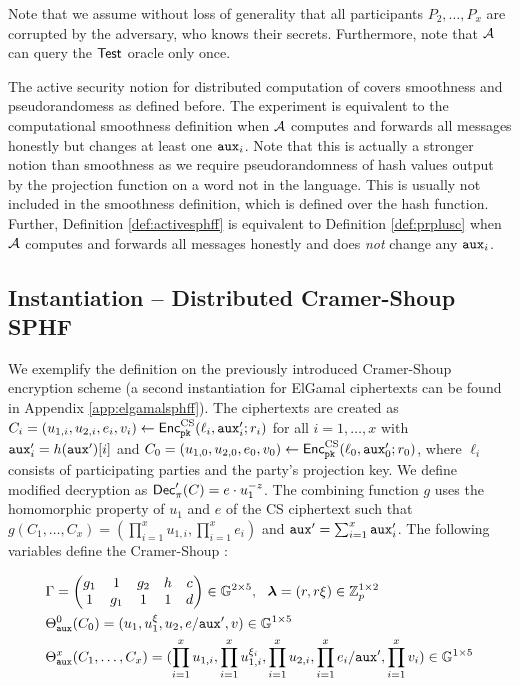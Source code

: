 \noindent
Note that we assume without loss of generality that all participants $P_2,\dots,P_x$ are corrupted by the adversary, who knows their secrets.
Furthermore, note that $\mathcal{A}$ can query the $\mathsf{Test}$ oracle only once.

The active security notion for distributed computation of \SPHFF covers smoothness and pseudorandomess as defined before.
The experiment is equivalent to the computational smoothness definition when $\mathcal{A}$ computes and forwards all messages honestly but changes at least one $\mathtt{aux}_i$.
Note that this is actually a stronger notion than smoothness as we require pseudorandomness of hash values output by the projection function on a word not in the language.
This is usually not included in the smoothness definition, which is defined over the hash function.
Further, Definition \ref{def:activesphff} is equivalent to Definition \ref{def:prplusc} when $\mathcal{A}$ computes and forwards all messages honestly and does \emph{not} change any $\mathtt{aux}_i$.

\subsection{Instantiation -- Distributed Cramer-Shoup SPHF}\label{sec:dcssphf}
We exemplify the \SPHFF definition on the previously introduced Cramer-Shoup encryption scheme (a second instantiation for ElGamal ciphertexts can be found in Appendix \ref{app:elgamalsphff}).
The ciphertexts are created as $C_i=(u_{1,i},u_{2,i},e_{i},v_i)\gets\mathsf{Enc}^{\mathrm{CS}}_{\mathtt{pk}}(\ell_i,\mathtt{aux}'_i;r_i)$ for all $i=1,\dots,x$ with $\mathtt{aux}'_i=h(\mathtt{aux}')[i]$ and $C_0=(u_{1,0},u_{2,0},\allowbreak e_{0},v_0)\gets\mathsf{Enc}^{\mathrm{CS}}_{\mathtt{pk}}(\ell_0,\allowbreak \mathtt{aux}'_0;r_0)$, where $\ell_i$ consists of participating parties and the party's projection key.
We define modified decryption as $\mathsf{Dec}'_\pi(C)=e\cdot u_1^{-z}$.
The combining function $g$ uses the homomorphic property of $u_1$ and $e$ of the CS ciphertext such that $g(C_1,\dots,C_x)=(\prod^x_{i=1}u_{1,i},\prod^x_{i=1}e_i)$ and $\mathtt{aux}'=\sum_{i=1}^{x}\mathtt{aux}'_i$.
The following variables define the Cramer-Shoup \SPHFF:

\begin{align*}
& \Gamma=
		\begin{pmatrix}
			g_1 & 1 & g_2 & h & c \\
			1 & g_1 & 1 & 1 & d
		\end{pmatrix} \in \mathbb{G}^{2\times 5},~~
		{\bm \lambda}=(r, r\xi)\in\mathbb{Z}_p^{1\times 2} \\
& \Theta^0_{\mathtt{aux}}(C_0)=(u_1,u_1^\xi,u_2,e/\mathtt{aux}',v)\in\mathbb{G}^{1\times 5} \\
& \Theta^x_{\mathtt{aux}}(C_1,\dots,C_x)=(\prod^x_{i=1}u_{1,i},\prod^x_{i=1}u_{1,i}^{\xi_i},\prod^x_{i=1}u_{2,i},\prod^x_{i=1}e_i/\mathtt{aux}',\prod^x_{i=1}v_i)\in\mathbb{G}^{1\times 5}
\end{align*}

